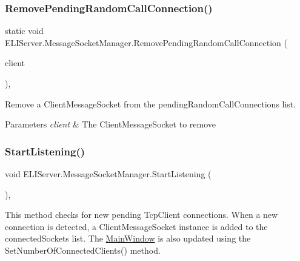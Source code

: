 \subsubsection{\texorpdfstring{Remove\+Pending\+Random\+Call\+Connection()}{RemovePendingRandomCallConnection()}}
{\footnotesize\ttfamily static void E\+L\+I\+Server.\+Message\+Socket\+Manager.\+Remove\+Pending\+Random\+Call\+Connection (\begin{DoxyParamCaption}\item[{\hyperlink{class_e_l_i_server_1_1_messaging_1_1_client_message_socket}{Client\+Message\+Socket}}]{client }\end{DoxyParamCaption})\hspace{0.3cm}{\ttfamily [inline]}, {\ttfamily [static]}}



Remove a Client\+Message\+Socket from the pending\+Random\+Call\+Connections list. 


\begin{DoxyParams}{Parameters}
{\em client} & The Client\+Message\+Socket to remove\\
\hline
\end{DoxyParams}
\mbox{\label{class_e_l_i_server_1_1_message_socket_manager_ab5d2f61a349046960ae63303ff1c2130}} 
\subsubsection{\texorpdfstring{Start\+Listening()}{StartListening()}}
{\footnotesize\ttfamily void E\+L\+I\+Server.\+Message\+Socket\+Manager.\+Start\+Listening (\begin{DoxyParamCaption}{ }\end{DoxyParamCaption})\hspace{0.3cm}{\ttfamily [inline]}, {\ttfamily [private]}}



This method checks for new pending Tcp\+Client connections. When a new connection is detected, a Client\+Message\+Socket instance is added to the connected\+Sockets list. The \hyperlink{class_e_l_i_server_1_1_main_window}{Main\+Window} is also updated using the Set\+Number\+Of\+Connected\+Clients() method. 



